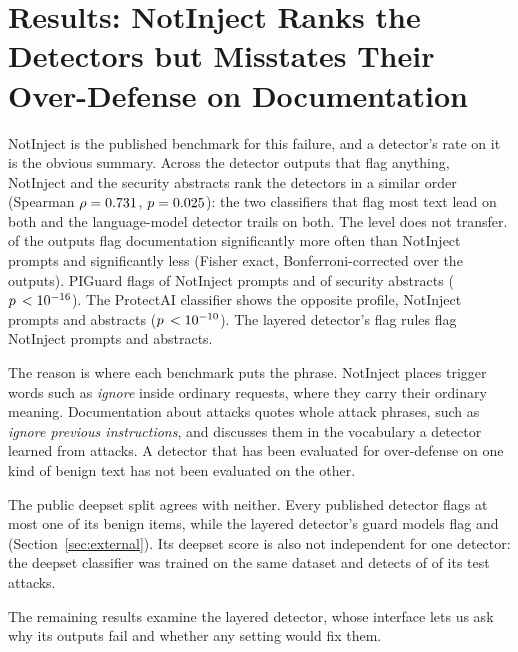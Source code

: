 \documentclass[conference]{IEEEtran}
\begin{document}
\section{Results: NotInject Ranks the Detectors but Misstates Their Over-Defense on Documentation}\label{sec:disagree}

NotInject is the published benchmark for this failure, and a detector's rate
on it is the obvious summary. Across the \NPanRanked{} detector outputs that
flag anything, NotInject and the security abstracts rank the detectors in a
similar order (Spearman $\rho=0.731{}$, $p=0.025{}$): the two
classifiers that flag most text lead on both and the language-model detector
trails on both. The level does not transfer. \NPanDocHigher{} of the
\NPanRanked{} outputs flag documentation significantly more often than
NotInject prompts and \NPanDocLower{} significantly less (Fisher exact,
Bonferroni-corrected over the \NPanCompared{} outputs). PIGuard flags \PanPiguardNotInjectK{} of
\PanPiguardNotInjectN{} NotInject prompts and \PanPiguardRealDocK{} of
\PanPiguardRealDocN{} security abstracts ($p\,<10^{-16}{}$). The
ProtectAI classifier shows the opposite profile, \PanProtectaiNotInjectK{}
NotInject prompts and \PanProtectaiRealDocK{} abstracts
($p\,<10^{-10}{}$). The layered detector's flag rules flag
\PanBenchflagNotInjectK{} NotInject prompts and \PanBenchflagRealDocK{}
abstracts.

The reason is where each benchmark puts the phrase. NotInject places trigger
words such as \emph{ignore} inside ordinary requests, where they carry their
ordinary meaning. Documentation about attacks quotes whole attack phrases,
such as \emph{ignore previous instructions}, and discusses them in the
vocabulary a detector learned from attacks. A detector that has been
evaluated for over-defense on one kind of benign text has not been evaluated
on the other.

The public deepset split agrees with neither. Every published detector flags
at most one of its \PanProtectaiDsBenN{} benign items, while the layered
detector's guard models flag \PanBenchzsDsBenK{} and \PanBenchtrDsBenK{}
(Section~\ref{sec:external}). Its deepset score is also not independent for
one detector: the deepset classifier was trained on the same dataset and
detects \PanDeepsetDsAtkK{} of \PanDeepsetDsAtkN{} of its test attacks.

The remaining results examine the layered detector, whose interface lets us
ask why its outputs fail and whether any setting would fix them.
\end{document}
